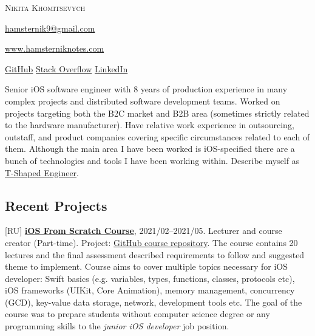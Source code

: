 \documentclass{nk-resume}
\begin{document}


\textsc{\huge{Nikita Khomitsevych}}

\vspace*{14px}

\href{mailto:hamsternik9@gmail.com}{hamsternik9@gmail.com} 

\href{https://hamsterniknotes.com}{www.hamsterniknotes.com}

\href{http://github.com/hamsternik}{\normalsize{GitHub}}
\hspace{2px}
\href{https://stackoverflow.com/users/3527499/hamsternik}{\normalsize{Stack Overflow}}
\hspace{2px}
\href{https://www.linkedin.com/in/khomitsevych/}{\normalsize{LinkedIn}} 

\vspace*{14px}

Senior iOS software engineer with 8 years of production experience in many complex projects 
and distributed software development teams. Worked on projects targeting both the B2C market and B2B area 
(sometimes strictly related to the hardware manufacturer). Have relative work experience in outsourcing, outstaff, and product 
companies covering specific circumstances related to each of them. Although the main area I have been worked is iOS-specified 
there are a bunch of technologies and tools I have been working within.
Describe myself as \href{https://alexkondov.com/the-t-shaped-engineer/}{T-Shaped Engineer}.


\subsection*{Recent Projects}

[RU] \textbf{\href{https://robotdreams.cc/course/ios-razrabotka-prilozheniy-s-0}{iOS From Scratch Course}}, 2021/02--2021/05.
\newline Lecturer and course creator (Part-time). Project: \href{https://github.com/hamsternik/robotdreams-ios-course}{GitHub course repository}.
\newline The course contains 20 lectures and the final assessment described requirements to follow and suggested theme to implement.
Course aims to cover multiple topics necessary for iOS developer:
Swift basics (e.g. variables, types, functions, classes, protocols etc), iOS frameworks (UIKit, Core Animation), 
memory management, concurrency (GCD), key-value data storage, network, development tools etc.
\newline The goal of the course was to prepare students without computer science degree or any programming skills to the \textit{junior iOS developer} job position.
\end{document}
